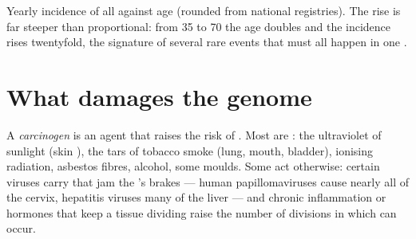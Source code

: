\begin{omfigure}

{\small Yearly incidence of all  against age (rounded from
national registries). The rise is far steeper than proportional: from
35 to 70 the age doubles and the incidence rises twentyfold, the
signature of several rare events that must all happen in one .}
\end{omfigure}

\section{What damages the genome}

\begin{definition}[Carcinogen]\label{def:g11:cancer:carcinogen}
A \emph{carcinogen} is an agent that raises the
risk of . Most are : the ultraviolet of sunlight (skin
), the tars of tobacco smoke (lung, mouth, bladder), ionising
radiation, asbestos fibres, alcohol, some moulds. Some act otherwise:
certain viruses carry  that jam the 's brakes --- human
papillomaviruses cause nearly all  of the cervix, hepatitis
viruses many  of the liver --- and chronic inflammation or
hormones that keep a tissue dividing raise the number of divisions in
which  can occur.
\end{definition}

